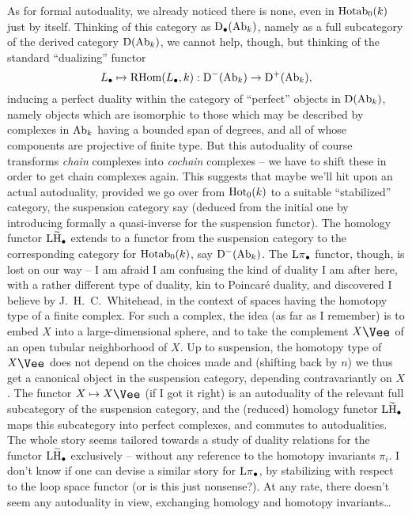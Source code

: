 \begin{remarks}
  As for formal autoduality, we already noticed there is none, even in
  $\operatorname{Hotab}_0(k)$ just by itself. Thinking of this category as
  ${\mathrm{D}}_\bullet(\operatorname{Ab}_k)$, namely as a full subcategory of the derived
  category ${\mathrm{D}}(\operatorname{Ab}_k)$, we cannot help, though, but thinking of the
  standard ``dualizing'' functor
  \[L_\bullet \mapsto \operatorname{RHom}(L_\bullet,k): {\mathrm{D}}^-(\operatorname{Ab}_k)\to
  {\ensuremath{\mathrm{D}}}^+(\operatorname{Ab}_k),\]
  inducing a perfect duality within the category of ``perfect''
  objects in ${\mathrm{D}}(\operatorname{Ab}_k)$, namely objects which are isomorphic to
  those which may be described by complexes in $\operatorname{Ab}_k$ having a
  bounded span of degrees, and all of whose components are projective
  of finite type. But this autoduality of course transforms
  \emph{chain} complexes into \emph{cochain} complexes -- we have to
  shift these in order to get chain complexes again. This suggests
  that maybe we'll hit upon an actual autoduality, provided we go over
  from $\operatorname{Hot}_0(k)$ to a suitable ``stabilized'' category, the
  suspension category say (deduced from the initial one by introducing
  formally a quasi-inverse for the suspension functor). The homology
  functor $\operatorname{L\widetilde H}_\bullet$ extends to a functor from the suspension
  category to the corresponding category for $\operatorname{Hotab}_0(k)$, say
  ${\mathrm{D}}^-(\operatorname{Ab}_k)$. The $\operatorname{L\pi}_\bullet$ functor, though, is
  lost on our way -- I am afraid I am confusing the kind of duality I
  am after here, with a rather different type of duality, kin to
  Poincaré duality, and discovered I believe by J.~H.~C.~Whitehead, in
  the context of spaces having the homotopy type of a finite
  complex. For such a complex, the idea (as far as I remember) is to
  embed $X$ into a large-dimensional sphere, and to take the
  complement $X\upvee$ of an open tubular neighborhood of $X$. Up to
  suspension, the homotopy type of $X\upvee$ does not depend on the
  choices made and (shifting back by $n$) we thus get a canonical
  object in the suspension category, depending contravariantly on
  $X$. The functor $X\mapsto X\upvee$ (if I got it right) is an
  autoduality of the relevant full subcategory of the suspension
  category, and the (reduced) homology functor $\operatorname{L\widetilde H}_\bullet$ maps
  this subcategory into perfect complexes, and commutes to
  autodualities. The whole story seems tailored towards a study of
  duality relations for the functor $\operatorname{L\widetilde H}_\bullet$ exclusively --
  without any reference to the homotopy invariants $\pi_i$. I don't
  know if one can devise a similar story for $\operatorname{L\pi}_\bullet$, by
  stabilizing with respect to the loop space functor (or is this just
  nonsense?). At any rate, there doesn't seem any autoduality in view,
  exchanging homology and homotopy invariants\dots
\end{remarks}

